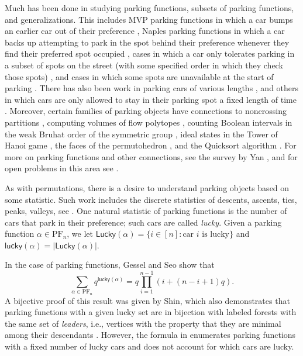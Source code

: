 \documentclass[reqno]{amsart}
\newcommand{\lucky}{\mathsf{lucky}}
\newcommand{\PF}{\mathrm{PF}}
\newcommand{\Lucky}{\mathsf{Lucky}}
\theoremstyle{definition}
\theoremstyle{remark}
\begin{document}
Much has been done in studying parking functions, subsets of parking functions, and generalizations. 
This includes MVP parking functions in which a car bumps an earlier car out of their preference \cite{MVP}, Naples parking functions in which a car backs up attempting to park in the spot behind their preference whenever they find their preferred spot occupied \cites{naples,naplesCatalan,naplesandstats}, cases in which a car only tolerates parking in a subset of spots on the street (with some specified order in which they check those spots) \cites{SamSpiro, pullback, ellinterval, Colaric2020IntervalPF,fang2024vacillatingparkingfunctions,bradt2024unitintervalparkingfunctions}, and cases in which some spots are unavailable at the start of parking \cite{completions}. 
There has also been work in parking cars of various lengths \cites{assortments,countingassortments}, and others in which cars are only allowed to stay in their parking spot a fixed length of time \cite{metered}. 
Moreover, certain families of parking objects have connections to noncrossing partitions \cite{stanley1997parking}, computing volumes of flow polytopes \cite{flowpolys}, counting Boolean intervals in the weak Bruhat order of the symmetric group \cite{boolean}, ideal states in the Tower of Hanoi game \cite{hanoi}, the faces of the permutohedron \cite{unit_perm}, and the Quicksort algorithm \cite{quicksort}.
For more on parking functions and other connections, see the survey by Yan \cite{Yan2015}, and for open problems in this area see \cite{PFCYOA}.


As with permutations, there is a desire to understand parking objects based on some statistic. 
Such work includes the discrete statistics of descents, ascents, ties, peaks, valleys, see 
\cites{statsinPFs,celano2025statisticsellintervalparkingfunctions,DescentsInPF}.
One natural statistic of parking functions is the number of cars that park in their preference; such cars are called \emph{lucky}. 
Given a parking function $\alpha\in\PF_n$, we let $\Lucky(\alpha)=\{i\in[n]: \mbox{car } i \mbox{ is lucky} \}$ and $\lucky(\alpha)=|\Lucky(\alpha)|$.


In the case of parking functions, Gessel and Seo \cite{GesselSeo} show that 
\begin{equation}
\label{eq:gesselseo}
\sum_{\alpha\in\PF_n}q^{\lucky(\alpha)}=q\prod_{i=1}^{n-1}(i+(n-i+1)q). 
\end{equation}
A bijective proof of this result was given by Shin, which also demonstrates that parking functions with a given lucky set are in bijection with labeled forests with the same set of \emph{leaders}, i.e., vertices with the property that they are minimal among their descendants \cite{shin2008newbijectionforestsparking}. However, the formula in  enumerates parking functions with a fixed number of lucky cars and does not account for which cars are lucky. 
\end{document}

